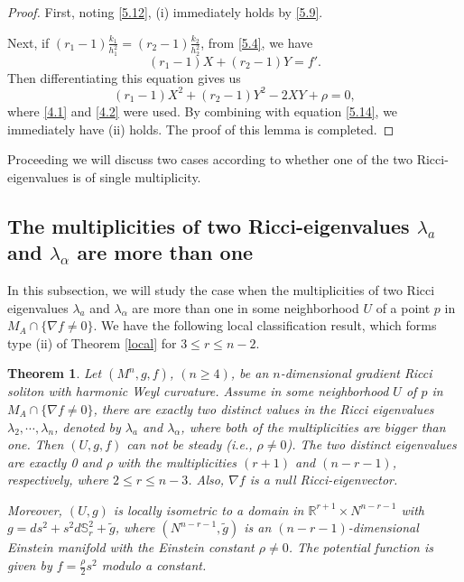 \documentclass{amsart}
\newtheorem{theorem}{Theorem}[section]
\theoremstyle{definition}
\theoremstyle{remark}
\numberwithin{equation}{section}
\begin{document}
\begin{proof}
	First, noting \eqref{5.12}, (i) immediately holds by \eqref{5.9}.
	
	Next, if $(r_1-1)\frac{k_1}{h^2_1}=(r_2-1)\frac{k_2}{h^2_2}$, from \eqref{5.4}, we have
	\[
	(r_1-1)X+(r_2-1)Y=f'.
	\]
	Then differentiating this equation gives us
	\[
	(r_1-1)X^2+(r_2-1)Y^2-2XY+\rho=0,
	\]
	where \eqref{4.1} and \eqref{4.2} were used.
	By combining with equation \eqref{5.14}, we immediately have (ii) holds. 
The proof of this lemma is completed. 	
\end{proof}
Proceeding we will discuss two cases according to 
whether one of the two Ricci-eigenvalues is of single multiplicity.

\subsection{The multiplicities of two Ricci-eigenvalues $\lambda_a$ and $\lambda_\alpha$ are more than one}
In this subsection, we will study the case when the multiplicities of two Ricci eigenvalues 
$\lambda_a$ and $\lambda_\alpha$ are more than one in some neighborhood $U$ of a point $p$ in $M_A \cap \{ \nabla f \neq 0  \}$.
We have the following local classification result, 
which forms type {\rm (ii)} of Theorem \ref{local} for $3\leq r\leq n-2$.
	
\begin{theorem} \label{twodis}
	Let $(M^n, g, f)$, $(n\geq 4)$, be an $n$-dimensional gradient Ricci soliton with harmonic Weyl curvature.
	Assume in some neighborhood $U$ of $p$ in $M_A \cap \{ \nabla f \neq 0  \}$, there are exactly two distinct values in the Ricci eigenvalues $\lambda_2, \cdots, \lambda_n$, denoted by $\lambda_a$ and $\lambda_\alpha$, where both of the multiplicities are bigger than one. 
	Then $(U,g,f)$ can not be steady (i.e., $\rho\neq0$). The two distinct eigenvalues are exactly  0 and $\rho$ with the multiplicities $(r+1)$ and $(n-r-1)$, respectively, where $2\leq r\leq n-3$. 
	Also, $\nabla f$ is a null Ricci-eigenvector.
	
	Moreover, $(U,g)$ is locally isometric to a domain in 
	$\mathbb{R}^{r+1}\times N^{n-r-1}$
	with $g= ds^2 + s^2d\mathbb{S}^2_{r}+\tilde{g} $,
	where $\left(N^{n-r-1}, \tilde{g}\right)$ 
	is an $(n-r-1)$-dimensional Einstein manifold
	with the Einstein constant $\rho\neq 0$.
	The potential function is given by $f = \frac{\rho}{2}s^2$ modulo a constant.
	\end{theorem}
\end{document}

